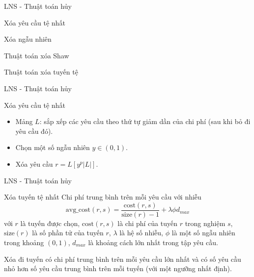 \begin{frame}{LNS - Thuật toán hủy}
  \begin{block}{Xóa yêu cầu tệ nhất}
  \end{block}
  \begin{block}{Xóa ngẫu nhiên}
  \end{block}
  \begin{block}{Thuật toán xóa Shaw}
  \end{block}
  \begin{block}{ Thuật toán xóa tuyến tệ}
  \end{block}
\end{frame}

\begin{frame}{LNS - Thuật toán hủy}
  \begin{block}{Xóa yêu cầu tệ nhất}
    \begin{itemize}
      \item Mảng $L$: sắp xếp các yêu cầu theo thứ tự giảm dần của chi phí (sau khi bỏ đi yêu cầu đó).
      \item Chọn một số ngẫu nhiên $y \in (0,1)$.
      \item Xóa yêu cầu $r = L[y^p|L|]$.
    \end{itemize}
  \end{block}
\end{frame}

\begin{frame}{LNS - Thuật toán hủy}
  \begin{block}{Xóa tuyến tệ nhất}
    Chi phí trung bình trên mỗi yêu cầu với nhiễu
    \begin{equation}
      \label{eq:destroy_route}
      \text{avg\_cost}(r, s) = \frac{\text{cost}(r, s)}{\text{size}(r)-1} + \lambda \phi d_{max}
    \end{equation}
    với $r$ là tuyến được chọn, $\text{cost}(r,s)$ là chi phí của tuyến $r$ trong nghiệm $s$, $\text{size}(r)$ là số phần tử của tuyến $r$, $\lambda$ là hệ số nhiễu, $\phi$ là một số ngẫu nhiên trong khoảng $(0,1)$, $d_{max}$ là khoảng cách lớn nhất trong tập yêu cầu.
    
    Xóa đi tuyến có chi phí trung bình trên mỗi yêu cầu lớn nhất và có số yêu cầu nhỏ hơn số yêu cầu trung bình trên mỗi tuyến (với một ngưỡng nhất định).
  \end{block}
\end{frame}

